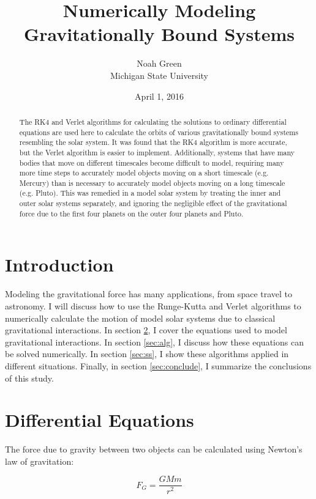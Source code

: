 \documentclass[a4paper,12pt]{report}
\begin{document}
\title{Numerically Modeling Gravitationally Bound Systems}
\author{Noah Green \\ Michigan State University}
\date{April 1, 2016}
\maketitle
\begin{abstract}
The RK4 and Verlet algorithms for calculating the solutions to ordinary differential equations are used here to calculate the orbits of various gravitationally bound systems resembling the solar system. It was found that the RK4 algorithm is more accurate, but the Verlet algorithm is easier to implement. Additionally, systems that have many bodies that move on different timescales become difficult to model, requiring many more time steps to accurately model objects moving on a short timescale (e.g. Mercury) than is necessary to accurately model objects moving on a long timescale (e.g. Pluto). This was remedied in a model solar system by treating the inner and outer solar systems separately, and ignoring the negligible effect of the gravitational force due to the first four planets on the outer four planets and Pluto.
\end{abstract}

\doublespacing
\section{Introduction}\label{sec:intro}
Modeling the gravitational force has many applications, from space travel to astronomy. I will discuss how to use the Runge-Kutta and Verlet algorithms to numerically calculate the motion of model solar systems due to classical gravitational interactions. In section \ref{sec:diffeq}, I cover the equations used to model gravitational interactions. In section \ref{sec:alg}, I discuss how these equations can be solved numerically. In section \ref{sec:ss}, I show these algorithms applied in different situations. Finally, in section \ref{sec:conclude}, I summarize the conclusions of this study.

\section{Differential Equations}\label{sec:diffeq}
The force due to gravity between two objects can be calculated using Newton's law of gravitation:

\begin{equation}\label{eq:gravitation}
 F_G = \frac{GMm}{r^2}
\end{equation}
\end{document}
